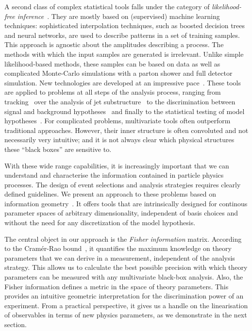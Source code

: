 A second class of complex statistical tools falls under the category of
\emph{likelihood-free inference}~\cite{cranmer:nips2016}. They are
mostly based on (supervised) machine learning techniques:
sophisticated interpolation techniques, such as boosted decision trees
and neural networks, are used to describe patterns in a set of
training samples. This approach is agnostic about the amplitudes
describing a process. The methods with which the input samples are
generated is irrelevant. Unlike simple likelihood-based methods, these
samples can be based on data as well as complicated Monte-Carlo
simulations with a parton shower and full detector simulation. New
technologies are developed at an impressive
pace~\cite{Cranmer:2015bka, Louppe:2016ylz, Louppe:2016aov,
  Cranmer:2016lzt, Baldi:2016fzo}. These tools are applied to problems
at all steps of the analysis process, ranging from
tracking~\cite{Brehmer:ghost_probability} over the analysis of jet
substructure~\cite{Cogan:2014oua, Baldi:2014pta, deOliveira:2015xxd,
  Almeida:2015jua, Baldi:2016fql, Guest:2016iqz, Komiske:2016rsd,
  Kasieczka:2017nvn, Louppe:2017ipp} to the discrimination between
signal and background hypotheses~\cite{Baldi:2014kfa, Searcy:2015apa,
  Santos:2016kno, Alves:2016htj} and finally to the statistical
testing of model hypotheses~\cite{Buckley:2011kc, Bornhauser:2013aya,
  Bechtle:2017vyu}. For complicated problems, multivariate tools often
outperform traditional approaches. However, their inner structure is
often convoluted and not necessarily very intuitive; and it is not
always clear which physical structures these ``black boxes'' are
sensitive to.

\newparagraph
%
With these wide range capabilities, it is increasingly important that
we can understand and characterise the information contained in
particle physics processes. The design of event selections and
analysis strategies requires clearly defined guidelines. We present an
approach to these problems based on information
geometry~\cite{efron1975, amari1982}. It offers tools that are
intrinsically designed for continous parameter spaces of arbitrary
dimensionality, independent of basis choices and without the need for
any discretization of the model hypothesis.

The central object in our approach is the \emph{Fisher information}
matrix. According to the Cram\'er-Rao bound~\cite{Rao:1945,
  Cramer:1946}, it quantifies the maximum knowledge on
theory parameters that we can derive in a measurement, independent of
the analysis strategy. This allows us to calculate the best possible
precision with which theory parameters can be measured with any
multivariate black-box analysis. Also, the Fisher information defines
a metric in the space of theory parameters. This provides an intuitive
geometric interpretation for the discrimination power of an
experiment. From a practical perspective, it gives us a handle on the
linearisation of observables in terms of new physics parameters, as we
demonstrate in the next section.

